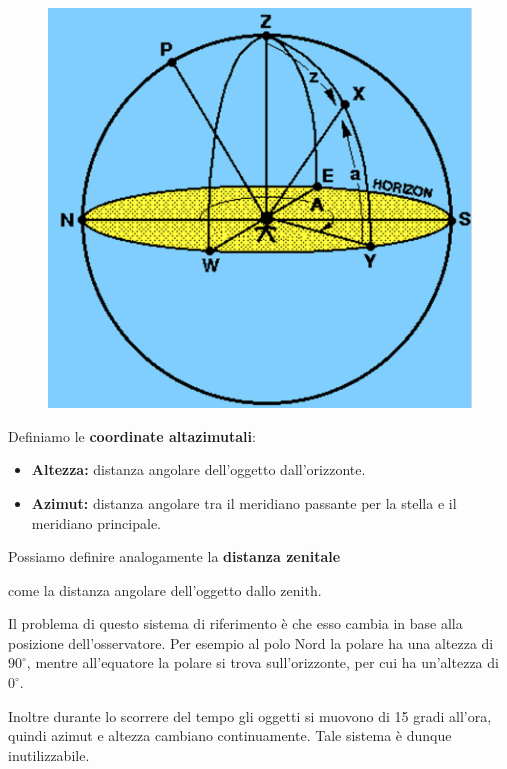 \begin{minipage}{0.295\textwidth}
    \begin{figure}[H]
        \includegraphics[width=5 cm]{immagini/coordinate_altazimutali.png}
    \end{figure}
\end{minipage}
\begin{minipage}{0.7\textwidth}
    \hspace{0.6cm}\vspace{-0.3cm}Definiamo le \textbf{coordinate altazimutali}:
    \vspace{0.3cm}
    \begin{itemize}
        \item \textbf{Altezza:} distanza angolare dell'oggetto dall'orizzonte.
        \item \textbf{Azimut:} distanza angolare tra il meridiano passante per la stella e il meridiano principale.
    \end{itemize}
    \hspace{0.6cm}Possiamo definire analogamente la \textbf{distanza zenitale} 
    
    \hspace{0.6cm}come la distanza angolare dell'oggetto dallo zenith.
\end{minipage}

Il problema di questo sistema di riferimento è che esso cambia in base alla posizione dell'osservatore. Per esempio al polo Nord la polare ha una altezza di $90^\circ$, mentre all'equatore la polare si trova sull'orizzonte, per cui ha un'altezza di $0^\circ$.


Inoltre durante lo scorrere del tempo gli oggetti si muovono di 15 gradi all'ora, quindi azimut e altezza cambiano continuamente. Tale sistema è dunque inutilizzabile.

